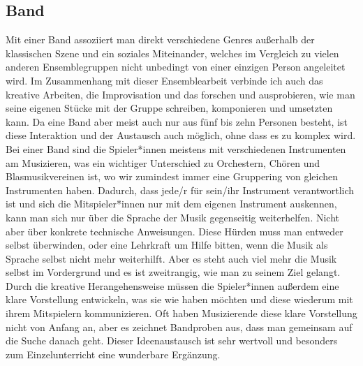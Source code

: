 \subsection{Band}
Mit einer Band assoziiert man direkt verschiedene Genres außerhalb der
klassischen Szene und ein soziales Miteinander, welches im Vergleich zu vielen
anderen Ensemblegruppen nicht unbedingt von einer einzigen Person angeleitet
wird. Im Zusammenhang mit dieser Ensemblearbeit verbinde ich auch das kreative
Arbeiten, die Improvisation und das forschen und ausprobieren, wie man seine
eigenen Stücke mit der Gruppe schreiben, komponieren und umsetzten kann. Da eine
Band aber meist auch nur aus fünf bis zehn Personen besteht, ist diese
Interaktion und der Austausch auch möglich, ohne dass es zu komplex wird. Bei
einer Band sind die Spieler*innen meistens mit verschiedenen Instrumenten am
Musizieren, was ein wichtiger Unterschied zu Orchestern, Chören und
Blasmusikvereinen ist, wo wir zumindest immer eine Gruppering von gleichen
Instrumenten haben. Dadurch, dass jede/r für sein/ihr Instrument verantwortlich
ist und sich die Mitspieler*innen nur mit dem eigenen Instrument auskennen, kann
man sich nur über die Sprache der Musik gegenseitig weiterhelfen. Nicht aber
über konkrete technische Anweisungen. Diese Hürden muss man entweder selbst
überwinden, oder eine Lehrkraft um Hilfe bitten, wenn die Musik als Sprache
selbst nicht mehr weiterhilft. Aber es steht auch viel mehr die Musik selbst im
Vordergrund und es ist zweitrangig, wie man zu seinem Ziel gelangt. Durch die
kreative Herangehensweise müssen die Spieler*innen außerdem eine klare
Vorstellung entwickeln, was sie wie haben möchten und diese wiederum mit ihrem
Mitspielern kommunizieren. Oft haben Musizierende diese klare Vorstellung nicht
von Anfang an, aber es zeichnet Bandproben aus, dass man gemeinsam auf die Suche
danach geht. Dieser Ideenaustausch ist sehr wertvoll und besonders zum
Einzelunterricht eine wunderbare Ergänzung.



